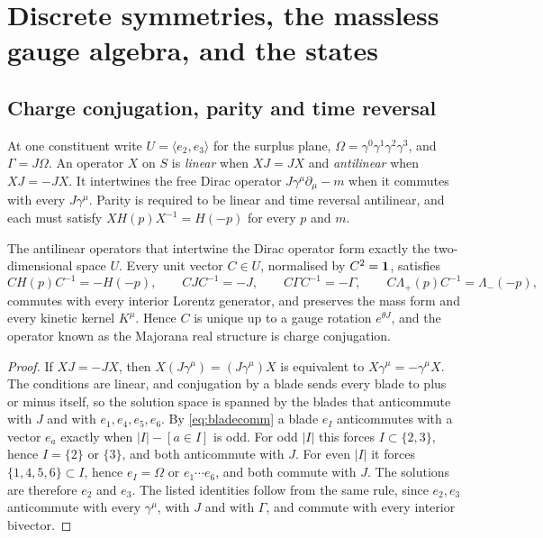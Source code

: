 

\section{Discrete symmetries, the massless gauge algebra, and the states}
\label{sec:discrete}

\subsection{Charge conjugation, parity and time reversal}

At one constituent write $U=\langle e_2,e_3\rangle$ for the surplus plane, $\Omega=\gamma^0\gamma^1\gamma^2\gamma^3$, and
$\Gamma=J\Omega$. An operator $X$ on $S$ is \emph{linear} when $XJ=JX$ and \emph{antilinear} when $XJ=-JX$. It intertwines the free
Dirac operator $J\gamma^\mu\partial_\mu-m$ when it commutes with every $J\gamma^\mu$. Parity is required to be linear and time
reversal antilinear, and each must satisfy $XH(p)X^{-1}=H(-p)$ for every $p$ and $m$.

\begin{theorem}
\label{thm:C}
The antilinear operators that intertwine the Dirac operator form exactly the two-dimensional space $U$. Every unit vector $C\in U$,
normalised by $C^2=\mathbf 1$, satisfies
\[
CH(p)C^{-1}=-H(-p),\qquad CJC^{-1}=-J,\qquad C\Gamma C^{-1}=-\Gamma,\qquad C\Lambda_+(p)C^{-1}=\Lambda_-(-p),
\]
commutes with every interior Lorentz generator, and preserves the mass form and every kinetic kernel $K^\mu$. Hence $C$ is unique up
to a gauge rotation $e^{\theta J}$, and the operator known as the Majorana real structure is charge conjugation.
\end{theorem}

\begin{proof}
If $XJ=-JX$, then $X(J\gamma^\mu)=(J\gamma^\mu)X$ is equivalent to $X\gamma^\mu=-\gamma^\mu X$. The conditions are linear, and
conjugation by a blade sends every blade to plus or minus itself, so the solution space is spanned by the blades that anticommute
with $J$ and with $e_1,e_4,e_5,e_6$. By \eqref{eq:bladecomm} a blade $e_I$ anticommutes with a vector $e_a$ exactly when
$|I|-[a\in I]$ is odd. For odd $|I|$ this forces $I\subset\{2,3\}$, hence $I=\{2\}$ or $\{3\}$, and both anticommute with $J$. For
even $|I|$ it forces $\{1,4,5,6\}\subset I$, hence $e_I=\Omega$ or $e_1\cdots e_6$, and both commute with $J$. The solutions are
therefore $e_2$ and $e_3$. The listed identities follow from the same rule, since $e_2,e_3$ anticommute with every $\gamma^\mu$, with
$J$ and with $\Gamma$, and commute with every interior bivector.
\end{proof}

